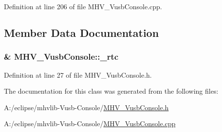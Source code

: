 \-Definition at line 206 of file \-M\-H\-V\-\_\-\-Vusb\-Console.\-cpp.



\subsection{\-Member \-Data \-Documentation}
\hypertarget{class_m_h_v___vusb_console_a0ccd1ee48d53ee1871f8d1d1ba068825}{
\subsubsection[{\-\_\-rtc}]{\& {\bf \-M\-H\-V\-\_\-\-Vusb\-Console\-::\-\_\-rtc}}}
\label{class_m_h_v___vusb_console_a0ccd1ee48d53ee1871f8d1d1ba068825}


\-Definition at line 27 of file \-M\-H\-V\-\_\-\-Vusb\-Console.\-h.



\-The documentation for this class was generated from the following files\-:\begin{DoxyCompactItemize}
\item 
\-A\-:/eclipse/mhvlib-\/\-Vusb-\/\-Console/\hyperlink{_m_h_v___vusb_console_8h}{\-M\-H\-V\-\_\-\-Vusb\-Console.\-h}\item 
\-A\-:/eclipse/mhvlib-\/\-Vusb-\/\-Console/\hyperlink{_m_h_v___vusb_console_8cpp}{\-M\-H\-V\-\_\-\-Vusb\-Console.\-cpp}\end{DoxyCompactItemize}
